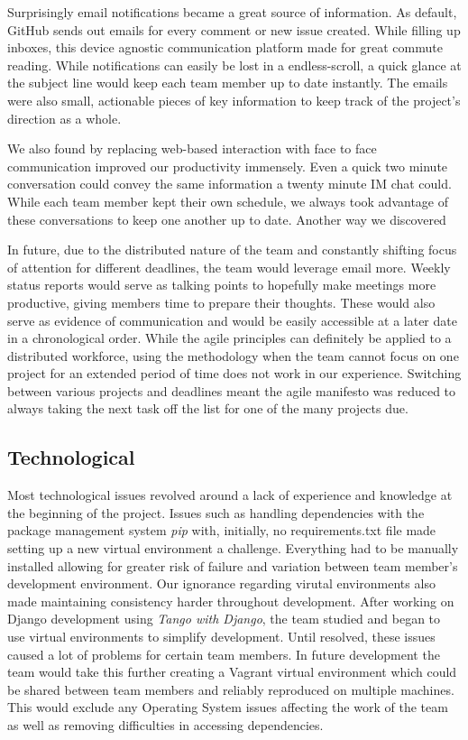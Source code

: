 \documentclass{l3proj}
\begin{document}
Surprisingly email notifications became a great source of information. As default, GitHub sends out emails for every comment or new issue created. While filling up inboxes, this device agnostic communication platform made for great commute reading. While notifications can easily be lost in a endless-scroll, a quick glance at the subject line would keep each team member up to date instantly. The emails were also small, actionable pieces of key information to keep track of the project's direction as a whole.

We also found by replacing web-based interaction with face to face communication improved our productivity immensely. Even a quick two minute conversation could convey the same information a twenty minute IM chat could. While each team member kept their own schedule, we always took advantage of these conversations to keep one another up to date. Another way we discovered

In future, due to the distributed nature of the team and constantly shifting focus of attention for different deadlines, the team would leverage email more. Weekly status reports would serve as talking points to hopefully make meetings more productive, giving members time to prepare their thoughts. These would also serve as evidence of communication and would be easily accessible at a later date in a chronological order. While the agile principles can definitely be applied to a distributed workforce, using the methodology when the team cannot focus on one project for an extended period of time does not work in our experience. Switching between various projects and deadlines meant the agile manifesto was reduced to always taking the next task off the list for one of the many projects due.

\subsection{Technological}		Most technological issues revolved around a lack of experience and knowledge at the beginning of the project. Issues such as handling dependencies with the package management system \textit{pip} with, initially, no requirements.txt file made setting up a new virtual environment a challenge. Everything had to be manually installed allowing for greater risk of failure and variation between team member's development environment. Our ignorance regarding virutal environments also made maintaining consistency harder throughout development. After working on \gls{Django} development using \textit{Tango with Django}, the team studied and began to use virtual environments to simplify development. Until resolved, these issues caused a lot of problems for certain team members. In future development the team would take this further creating a Vagrant virtual environment which could be shared between team members and reliably reproduced on multiple machines. This would exclude any Operating System issues affecting the work of the team as well as removing difficulties in accessing dependencies.
\end{document}
